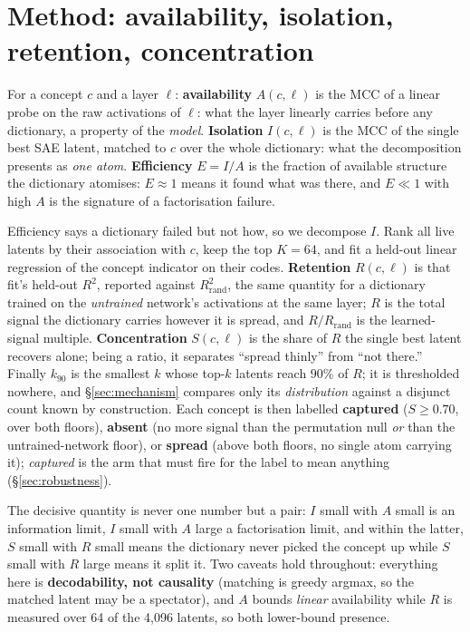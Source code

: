 \documentclass{article}
\begin{document}
\section{Method: availability, isolation, retention, concentration}
\label{sec:method}

For a concept $c$ and a layer $\ell$: \textbf{availability} $A(c,\ell)$ is the
MCC of a linear probe on the raw activations of $\ell$: what the layer linearly
carries before any dictionary, a property of the \emph{model}.
\textbf{Isolation} $I(c,\ell)$ is the MCC of the single best SAE latent, matched
to $c$ over the whole dictionary: what the decomposition presents as \emph{one
  atom}. \textbf{Efficiency} $E = I/A$ is the fraction of available structure the
dictionary atomises: $E \approx 1$ means it found what was there, and
$E \ll 1$ with high $A$ is the signature of a factorisation failure.

Efficiency says a dictionary failed but not how, so we decompose $I$. Rank all
live latents by their association with $c$, keep the top $K=64$, and fit a
held-out linear regression of the concept indicator on their codes.
\textbf{Retention} $R(c,\ell)$ is that fit's held-out $R^2$, reported against
$R^2_{\text{rand}}$, the same quantity for a dictionary trained on the
\emph{untrained} network's activations at the same layer; $R$ is the total
signal the dictionary carries however it is spread, and $R/R_{\text{rand}}$ is
the learned-signal multiple. \textbf{Concentration} $S(c,\ell)$ is the share of
$R$ the single best latent recovers alone; being a ratio, it separates ``spread
thinly'' from ``not there.'' Finally $k_{90}$ is the smallest $k$ whose top-$k$
latents reach $90\%$ of $R$; it is thresholded nowhere, and
\S\ref{sec:mechanism} compares only its \emph{distribution} against a disjunct
count known by construction. Each concept is then labelled \textbf{captured}
($S \ge 0.70$, over both floors), \textbf{absent} (no more signal than the
permutation null \emph{or} than the untrained-network floor), or \textbf{spread}
(above both floors, no single atom carrying it); \emph{captured} is the arm that
must fire for the label to mean anything (\S\ref{sec:robustness}).

The decisive quantity is never one number but a pair: $I$ small with $A$ small
is an information limit, $I$ small with $A$ large a factorisation limit, and
within the latter, $S$ small with $R$ small means the dictionary never picked the
concept up while $S$ small with $R$ large means it split it. Two caveats hold
throughout: everything here is \textbf{decodability, not causality} (matching is
greedy argmax, so the matched latent may be a spectator), and $A$ bounds
\emph{linear} availability while $R$ is measured over 64 of the 4{,}096 latents,
so both lower-bound presence.
\end{document}
